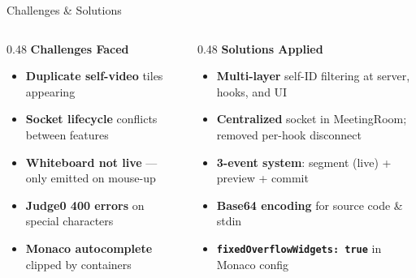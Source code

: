 \documentclass[aspectratio=169, 12pt]{beamer}
\begin{document}
\begin{frame}{Challenges \& Solutions}
  \vspace{0.3em}
  \begin{columns}[T]
    \begin{column}{0.48\textwidth}
      {\small\bfseries\color{MeetRed} Challenges Faced}
      \vspace{0.4em}
      \begin{itemize}\setlength{\itemsep}{0.45em}
        \item {\color{MeetRed}\bfseries Duplicate self-video} tiles appearing
        \item {\color{MeetRed}\bfseries Socket lifecycle} conflicts between features
        \item {\color{MeetRed}\bfseries Whiteboard not live} --- only emitted on mouse-up
        \item {\color{MeetRed}\bfseries Judge0 400 errors} on special characters
        \item {\color{MeetRed}\bfseries Monaco autocomplete} clipped by containers
      \end{itemize}
    \end{column}

    \begin{column}{0.48\textwidth}
      {\small\bfseries\color{MeetGreen} Solutions Applied}
      \vspace{0.4em}
      \begin{itemize}\setlength{\itemsep}{0.45em}
        \item {\color{MeetGreen}\bfseries Multi-layer} self-ID filtering at server, hooks, and UI
        \item {\color{MeetGreen}\bfseries Centralized} socket in MeetingRoom; removed per-hook disconnect
        \item {\color{MeetGreen}\bfseries 3-event system}: segment (live) + preview + commit
        \item {\color{MeetGreen}\bfseries Base64 encoding} for source code \& stdin
        \item {\color{MeetGreen}\bfseries \texttt{fixedOverflowWidgets: true}} in Monaco config
      \end{itemize}
    \end{column}
  \end{columns}
\end{frame}
\end{document}
